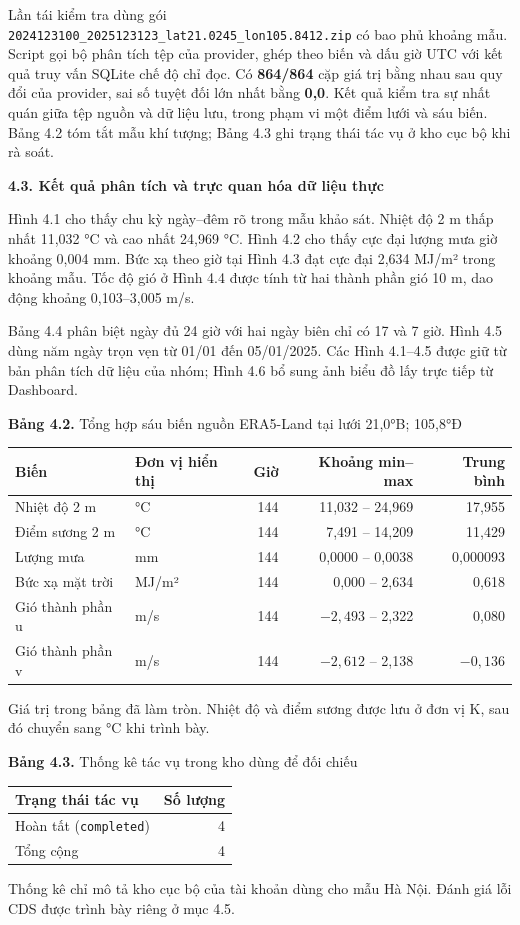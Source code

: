 \documentclass[12pt,a4paper]{article}
\newcommand{\pg}[1]{\newpage\pagenumbering{arabic}\setcounter{page}{#1}\thispagestyle{fancy}}
\newcommand{\heading}[1]{\par\medskip\noindent\textbf{#1}\par\nopagebreak}
\newcommand{\code}[1]{\texttt{#1}}
\newcommand{\captext}[1]{\begin{center}\small #1\end{center}}
\begin{document}
Lần tái kiểm tra dùng gói \code{2024123100\_2025123123\_lat21.0245\_lon105.8412.zip} có bao phủ khoảng mẫu. Script gọi bộ phân tích tệp của provider, ghép theo biến và dấu giờ UTC với kết quả truy vấn SQLite chế độ chỉ đọc. Có \textbf{864/864} cặp giá trị bằng nhau sau quy đổi của provider, sai số tuyệt đối lớn nhất bằng \textbf{0,0}. Kết quả kiểm tra sự nhất quán giữa tệp nguồn và dữ liệu lưu, trong phạm vi một điểm lưới và sáu biến. Bảng 4.2 tóm tắt mẫu khí tượng; Bảng 4.3 ghi trạng thái tác vụ ở kho cục bộ khi rà soát.
\heading{4.3. Kết quả phân tích và trực quan hóa dữ liệu thực}
Hình 4.1 cho thấy chu kỳ ngày–đêm rõ trong mẫu khảo sát. Nhiệt độ 2 m thấp nhất 11,032 °C và cao nhất 24,969 °C. Hình 4.2 cho thấy cực đại lượng mưa giờ khoảng 0,004 mm. Bức xạ theo giờ tại Hình 4.3 đạt cực đại 2,634 MJ/m² trong khoảng mẫu. Tốc độ gió ở Hình 4.4 được tính từ hai thành phần gió 10 m, dao động khoảng 0,103–3,005 m/s.
 
Bảng 4.4 phân biệt ngày đủ 24 giờ với hai ngày biên chỉ có 17 và 7 giờ. Hình 4.5 dùng năm ngày trọn vẹn từ 01/01 đến 05/01/2025. Các Hình 4.1–4.5 được giữ từ bản phân tích dữ liệu của nhóm; Hình 4.6 bổ sung ảnh biểu đồ lấy trực tiếp từ Dashboard.

\pg{29}
\captext{\textbf{Bảng 4.2.} Tổng hợp sáu biến nguồn ERA5-Land tại lưới 21,0°B; 105,8°Đ}
\begin{center}\small
\begin{tabular}{@{}llrrr@{}}
\toprule Biến & Đơn vị hiển thị & Giờ & Khoảng min–max & Trung bình\\\midrule
Nhiệt độ 2 m & °C & 144 & 11,032 – 24,969 & 17,955\\
Điểm sương 2 m & °C & 144 & 7,491 – 14,209 & 11,429\\
Lượng mưa & mm & 144 & 0,0000 – 0,0038 & 0,000093\\
Bức xạ mặt trời & MJ/m² & 144 & 0,000 – 2,634 & 0,618\\
Gió thành phần u & m/s & 144 & $-2,493$ – 2,322 & 0,080\\
Gió thành phần v & m/s & 144 & $-2,612$ – 2,138 & $-0,136$\\
\bottomrule
\end{tabular}
\end{center}
Giá trị trong bảng đã làm tròn. Nhiệt độ và điểm sương được lưu ở đơn vị K, sau đó chuyển sang °C khi trình bày.
\captext{\textbf{Bảng 4.3.} Thống kê tác vụ trong kho dùng để đối chiếu}
\begin{center}
\begin{tabular}{@{}lr@{}}
\toprule Trạng thái tác vụ & Số lượng\\\midrule
Hoàn tất (\code{completed}) & 4\\
Tổng cộng & 4\\
\bottomrule
\end{tabular}
\end{center}
Thống kê chỉ mô tả kho cục bộ của tài khoản dùng cho mẫu Hà Nội. Đánh giá lỗi CDS được trình bày riêng ở mục 4.5.
\end{document}
